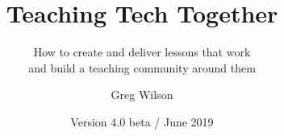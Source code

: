 \documentclass[nemilov1]{Nemilov}
\begin{document}
\title{Teaching Tech Together}
\subtitle{How to create and deliver lessons that work\\ and build a teaching community around them}
\author{Greg Wilson}
\date{Version 4.0 beta / June 2019}
\maketitle

\frontmatter

\tableofcontents


\mainmatter
















\cleardoublepage

\printbibliography

\appendix










\printindex
\end{document}
